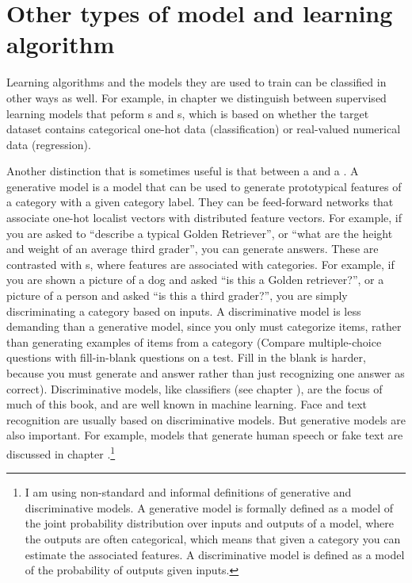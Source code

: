 \section{Other types of model and learning algorithm}

Learning algorithms and the models they are used to train can be classified in other ways as well. For example, in chapter  we distinguish between supervised learning models that peform s and s, which is based on whether the target dataset contains categorical one-hot data (classification) or real-valued numerical data (regression).  

Another distinction that is sometimes useful is that between a  and a . A generative model is a model that can be used to generate prototypical features of a category with a given category label. They can be feed-forward networks that associate one-hot localist vectors with distributed feature vectors. For example, if you are asked to ``describe a typical Golden Retriever'', or ``what are the height and weight of an average third grader'', you can generate answers. These are contrasted with s, where features are associated with categories. For example, if you are shown a picture of a dog and asked ``is this a Golden retriever?'', or a picture of a person and asked ``is this a third grader?'', you are simply discriminating a category based on inputs.  A discriminative model is less demanding than a generative model, since you only must categorize items, rather than generating examples of items from a category (Compare multiple-choice questions with fill-in-blank questions on a test. Fill in the blank is harder, because you must generate and answer rather than just recognizing one answer as correct). Discriminative models, like classifiers (see chapter ), are the focus of much of this book, and are well known in machine learning. Face and text recognition are usually based on discriminative models.  But generative models are also important. For example, models that generate human speech or fake text are discussed in chapter .\footnote{I am using non-standard and informal definitions of generative and discriminative models. A generative model is formally defined as a model of the joint probability distribution over inputs and outputs of a model, where the outputs are often categorical, which means that given a category you can estimate the associated features. A discriminative model is defined as a model of the probability of outputs given inputs.} 

